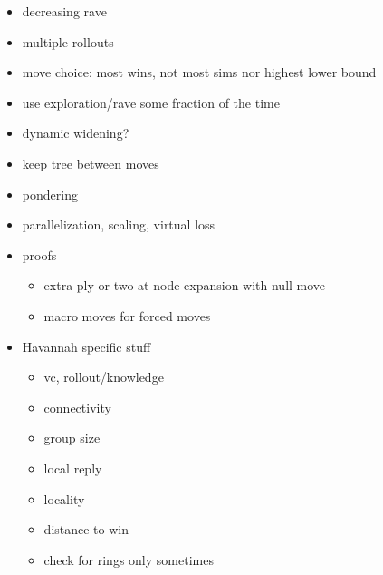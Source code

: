 \begin{itemize}

\item decreasing rave
\item multiple rollouts
\item move choice: most wins, not most sims nor highest lower bound
\item use exploration/rave some fraction of the time
\item dynamic widening?
\item keep tree between moves
\item pondering
\item parallelization, scaling, virtual loss
\item proofs
	\begin{itemize}
		\item extra ply or two at node expansion with null move
		\item macro moves for forced moves
	\end{itemize}
\item Havannah specific stuff
	\begin{itemize}
		\item vc, rollout/knowledge
		\item connectivity
		\item group size
		\item local reply
		\item locality
		\item distance to win
		\item check for rings only sometimes
	\end{itemize}
\end{itemize}






